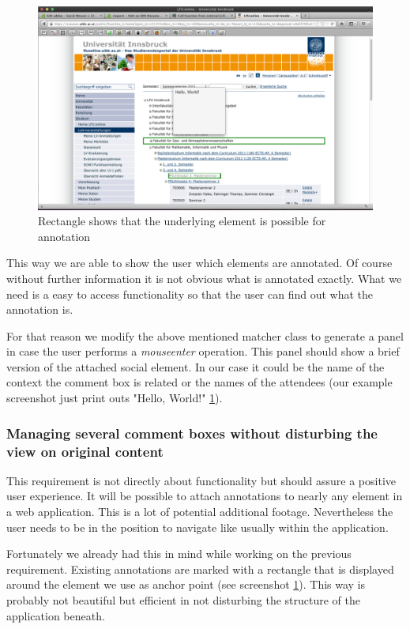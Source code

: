 \begin{figure} \centering
		\includegraphics[width=12cm]{images/annotation-rectangle-sample2.png}
		\caption{Rectangle shows that the underlying element is possible for annotation}
		\label{annotation-rectangle-sample2}
\end{figure} 

This way we are able to show the user which elements are annotated. Of course without further information it is not obvious what is annotated exactly. What we need is a easy to access functionality so that the user can find out what the annotation is. 

For that reason we modify the above mentioned matcher class to generate a panel in case the user performs a \emph{mouseenter} operation. This panel should show a brief version of the attached social element. In our case it could be the name of the context the comment box is related or the names of the attendees (our example screenshot just print outs "Hello, World!" \ref{annotation-rectangle-sample2}). 

\subsubsection{Managing several comment boxes without disturbing the view on original content}
This requirement is not directly about functionality but should assure a positive user experience. It will be possible to attach annotations to nearly any element in a web application. This is a lot of potential additional footage. Nevertheless the user needs to be in the position to navigate like usually within the application. 

Fortunately we already had this in mind while working on the previous requirement.  Existing annotations are marked with a rectangle that is displayed around the element we use as anchor point (see screenshot \ref{annotation-rectangle-sample2}). This way is probably not beautiful but efficient in not disturbing the structure of the application beneath. 

